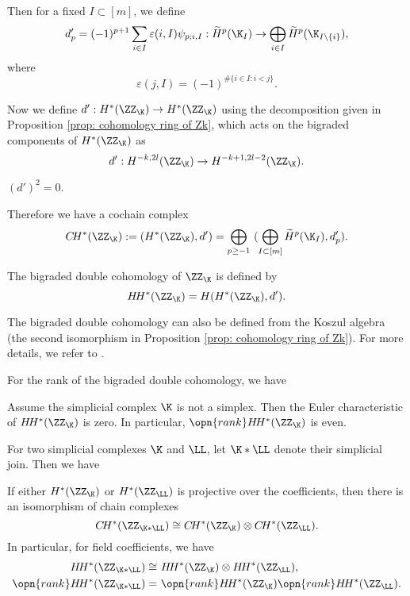 Then for a fixed $I\subset [m]$, we define
\begin{equation}
    \label{equ: def of dp}
    d_p'=(-1)^{p+1} \sum_{i\in I} \varepsilon(i,I) \psi_{p;i,I}:
    \widetilde{H}^p(\K_I)\to \bigoplus_{i\in I} 
    \widetilde{H}^p(\K_{I\setminus \{i\}}),
\end{equation}
where 
$$\varepsilon(j,I)=(-1)^{\#\{i\in I:i<j\}}.$$

Now we define $d':H^*(\ZZ_{\K})\to H^*(\ZZ_{\K})$ using the 
decomposition given in Proposition 
\ref{prop: cohomology ring of Zk}, which acts on the bigraded components of $H^*(\ZZ_{\K})$ as 
$$d': H^{-k,2l}(\ZZ_{\K})\to H^{-k+1,2l-2}(\ZZ_{\K}).$$

\begin{lem}
    \label{lem: d'd'=0}
    $(d')^2=0$.
\end{lem}
Therefore we have a cochain complex 
$$C\!H^*(\ZZ_{\K}):=(H^*(\ZZ_{\K}),d')=
\bigoplus_{p\ge -1}\ (\bigoplus_{I\subset [m]} \widetilde{H}^p(\K_I),d'_p).$$


\begin{defn}
    \label{def:double cohomology}
    The bigraded double cohomology of $\ZZ_{\K}$ is defined by
    $$H\!H^*(\ZZ_{\K})=H(H^*(\ZZ_{\K}),d').$$
\end{defn}
\begin{rem}
    The bigraded double cohomology can also be defined from the Koszul
    algebra (the second isomorphism in Proposition \ref{prop: cohomology ring of Zk}). For more details, we refer to \cite[Theorem 4.4]{LPSS-2023}.
\end{rem}

For the rank of the bigraded double cohomology, we have
\begin{prop}
    \label{prop: euler char is 0}
    Assume the simplicial complex $\K$ is not a simplex. Then the Euler characteristic of 
    $H\!H^*(\ZZ_{\K})$ is zero. In particular, $\opn{rank} H\!H^*(\ZZ_{\K})$
    is even. 
\end{prop}



For two simplicial complexes $\K$ and $\LL$, let $\K*\LL$ denote
their simplicial join. Then we have
\begin{prop}
    \label{prop: simplicial join}
    If either $H^*(\ZZ_{\K})$ or $H^*(\ZZ_{\LL})$ is
    projective over the coefficients, then there is an 
    isomorphism of chain complexes
    $$C\!H^*(\ZZ_{\K*\LL})\cong C\!H^*(\ZZ_{\K})\otimes
    C\!H^*(\ZZ_{\LL}).$$
    In particular, for field coefficients, we have 
    \begin{equation*}
        \begin{split}
            H\!H^*(\ZZ_{\K*\LL})\cong &\  H\!H^*(\ZZ_{\K})\otimes
    H\!H^*(\ZZ_{\LL}),\\
    \opn{rank} H\!H^*(\ZZ_{\K*\LL})= &\  \opn{rank} H\!H^*(\ZZ_{\K})
    \opn{rank} H\!H^*(\ZZ_{\LL}).\\
        \end{split}
    \end{equation*}
\end{prop}

